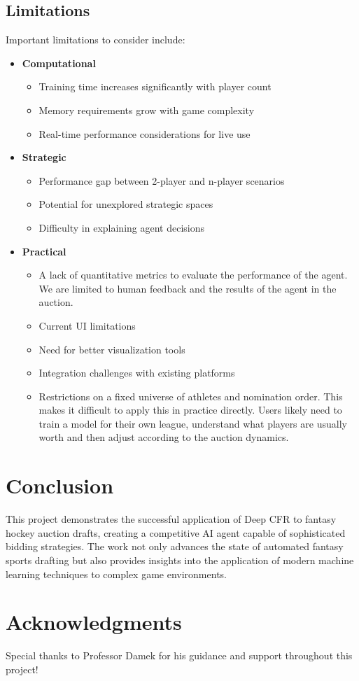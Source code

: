 \documentclass[11pt]{article}
\begin{document}
\subsection{Limitations}
Important limitations to consider include:

\begin{itemize}
    \item \textbf{Computational}
    \begin{itemize}
        \item Training time increases significantly with player count
        \item Memory requirements grow with game complexity
        \item Real-time performance considerations for live use
    \end{itemize}
    
    \item \textbf{Strategic}
    \begin{itemize}
        \item Performance gap between 2-player and n-player scenarios
        \item Potential for unexplored strategic spaces
        \item Difficulty in explaining agent decisions
    \end{itemize}
    
    \item \textbf{Practical}
    \begin{itemize}
        \item A lack of quantitative metrics to evaluate the performance of the agent. We are limited to human feedback and the results of the agent in the auction.
        \item Current UI limitations
        \item Need for better visualization tools
        \item Integration challenges with existing platforms
        \item Restrictions on a fixed universe of athletes and nomination order. This makes it difficult to apply this in practice directly. Users likely need to train a model for their own league, understand what players are usually worth and then adjust according to the auction dynamics.
    \end{itemize}
\end{itemize}

\section{Conclusion}
This project demonstrates the successful application of Deep CFR to fantasy hockey auction drafts, creating a competitive AI agent capable of sophisticated bidding strategies. The work not only advances the state of automated fantasy sports drafting but also provides insights into the application of modern machine learning techniques to complex game environments.

\section{Acknowledgments}
Special thanks to Professor Damek for his guidance and support throughout this project!
\end{document}
